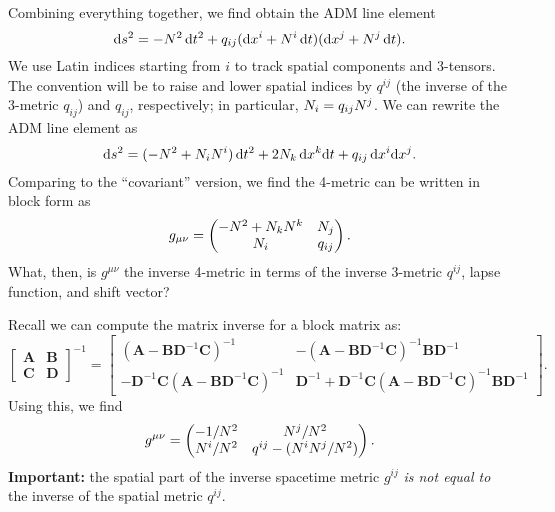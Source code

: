 Combining everything together, we find obtain the ADM line element
\begin{equation}
\mathrm{d} s^{2} = -N^{2}\,\mathrm{d} t^{2}
  + q_{ij}(\mathrm{d} x^{i} + N^{i}\,\mathrm{d} t)(\mathrm{d} x^{j} + N^{j}\,\mathrm{d} t).
\end{equation}
We use Latin indices starting from $i$ to track spatial components and
3-tensors. The convention will be to raise and lower spatial indices by
$q^{ij}$ (the inverse of the 3-metric $q_{ij}$) and $q_{ij}$, respectively; in particular, $N_{i}=q_{ij}N^{j}$.
We can rewrite the ADM line element as
\begin{equation}
  \mathrm{d} s^{2} = (-N^{2} + N_{i}N^{i})\,\mathrm{d} t^{2}
  + 2 N_{k}\,\mathrm{d} x^{k}\mathrm{d} t
  + q_{ij}\,\mathrm{d} x^{i}\mathrm{d} x^{j}.
\end{equation}
Comparing to the ``covariant'' version, we find the 4-metric can be
written in block form as
\begin{equation}
  g_{\mu\nu} = \begin{pmatrix}
    -N^{2} + N_{k}N^{k} & N_{j}\\
    N_{i} & q_{ij}
\end{pmatrix}.
\end{equation}
What, then, is $g^{\mu\nu}$ the inverse 4-metric in terms of the
inverse 3-metric $q^{ij}$, lapse function, and shift vector?

Recall we can compute the matrix inverse for a block matrix as:
\begin{equation}
  \begin{bmatrix}
    \mathbf{A} & \mathbf{B} \\
    \mathbf{C} & \mathbf{D}
   \end{bmatrix}^{-1} 
    = \begin{bmatrix}
     \left(\mathbf{A} - \mathbf{BD}^{-1}\mathbf{C}\right)^{-1} &
    -\left(\mathbf{A} - \mathbf{BD}^{-1}\mathbf{C}\right)^{-1}\mathbf{BD}^{-1} \\
    -\mathbf{D}^{-1}\mathbf{C}\left(\mathbf{A} - \mathbf{BD}^{-1}\mathbf{C}\right)^{-1} &
    \mathbf{D}^{-1} + \mathbf{D}^{-1}\mathbf{C}\left(\mathbf{A} - \mathbf{BD}^{-1}\mathbf{C}\right)^{-1}\mathbf{BD}^{-1}
  \end{bmatrix}.
\end{equation}
Using this, we find
\begin{equation}
  g^{\mu\nu}
  = \begin{pmatrix} -1/N^{2} & N^{j}/N^{2}\\
    N^{i}/N^{2} & q^{ij} - (N^{i}N^{j}/N^{2})
  \end{pmatrix}.
\end{equation}
\textbf{Important:} the spatial part of the inverse spacetime metric
$g^{ij}$ \emph{is not equal to} the inverse of the spatial metric $q^{ij}$.


